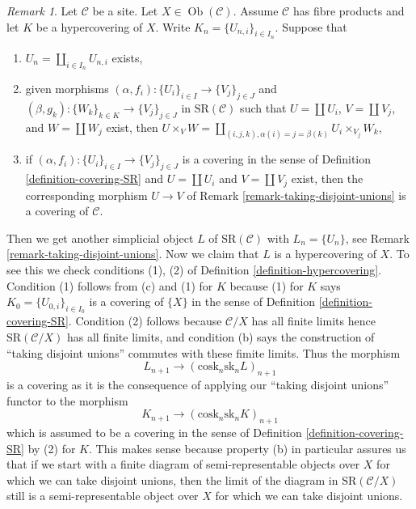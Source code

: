 \documentclass[10pt,a4paper]{article}
\theoremstyle{plain}
\theoremstyle{definition}
\theoremstyle{remark}
\newtheorem{remark}[subsection]{Remark}
\numberwithin{equation}{subsection}
\def\Ob{\mathop{\mathrm{Ob}}\nolimits}
\begin{document}
\begin{remark}
\label{remark-take-unions-hypercovering-X}
Let $\mathcal{C}$ be a site. Let $X \in \Ob(\mathcal{C})$.
Assume $\mathcal{C}$ has fibre products and let $K$ be a hypercovering of $X$.
Write $K_n = \{U_{n, i}\}_{i \in I_n}$. Suppose that
\begin{enumerate}
\item[(a)] $U_n = \coprod_{i \in I_n} U_{n, i}$ exists,
\item[(b)] given morphisms
$(\alpha, f_i) : \{U_i\}_{i \in I} \to \{V_j\}_{j \in J}$ and
$(\beta, g_k) : \{W_k\}_{k \in K} \to \{V_j\}_{j \in J}$
in $\text{SR}(\mathcal{C})$ such that
$U = \coprod U_i$, $V = \coprod V_j$, and $W = \coprod W_j$
exist, then $U \times_V W =
\coprod_{(i, j, k), \alpha(i) = j = \beta(k)} U_i \times_{V_j} W_k$,
\item[(c)] if $(\alpha, f_i) : \{U_i\}_{i \in I} \to \{V_j\}_{j \in J}$
is a covering in the sense of
Definition \ref{definition-covering-SR}
and $U = \coprod U_i$ and $V = \coprod V_j$ exist,
then the corresponding morphism $U \to V$
of Remark \ref{remark-taking-disjoint-unions}
is a covering of $\mathcal{C}$.
\end{enumerate}
Then we get another simplicial object $L$ of $\text{SR}(\mathcal{C})$
with $L_n = \{U_n\}$, see
Remark \ref{remark-taking-disjoint-unions}.
Now we claim that $L$ is a hypercovering of $X$.
To see this we check conditions (1), (2) of
Definition \ref{definition-hypercovering}.
Condition (1) follows from (c) and (1) for $K$
because (1) for $K$ says $K_0 = \{U_{0, i}\}_{i \in I_0}$
is a covering of $\{X\}$ in the sense of
Definition \ref{definition-covering-SR}.
Condition (2) follows because $\mathcal{C}/X$ has
all finite limits hence $\text{SR}(\mathcal{C}/X)$
has all finite limits, and condition (b) says the
construction of ``taking disjoint unions'' commutes
with these fimite limits. Thus the morphism
$$
L_{n + 1} \longrightarrow (\text{cosk}_n \text{sk}_n L)_{n + 1}
$$
is a covering as it is the consequence of applying our
``taking disjoint unions'' functor to the morphism
$$
K_{n + 1} \longrightarrow (\text{cosk}_n \text{sk}_n K)_{n + 1}
$$
which is assumed to be a covering in the sense of
Definition \ref{definition-covering-SR} by (2) for $K$.
This makes sense because property (b) in particular assures
us that if we start with a finite diagram of
semi-representable objects over $X$
for which we can take disjoint unions, then
the limit of the diagram in $\text{SR}(\mathcal{C}/X)$
still is a semi-representable object over $X$ for which
we can take disjoint unions.
\end{remark}








\end{document}
